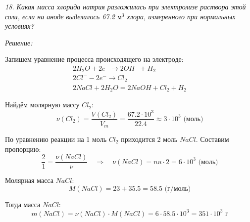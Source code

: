 \pagebreak

\emph{18. Какая масса хлорида натрия разложилась при электролизе раствора 
этой соли, если на аноде выделилось 67.2 \( \text{м}^3 \) хлора, 
измеренного при нормальных условиях?}

\emph{Решение:}

Запишем уравнение процесса происходящего на электроде:
\[
	\begin{array}{ll}
		2H_2O + 2e^{-} \rightarrow 2OH^{-} + H_2 \\
		2Cl^{-} - 2e^{-} \rightarrow Cl_2 \\
		2NaCl + 2H_2O = 2NaOH + Cl_2 + H_2
	\end{array}
\]

Найдём молярную массу \( Cl_2 \):
\[
	\nu(Cl_2) = \frac{V(Cl_2)}{V_m} = \frac{67.2\cdot10^3}{22.4} \approx 
	3\cdot10^3 \text{ (моль)}
\]

По уравнению реакции на 1 моль \( Cl_2 \) приходится 2 моль \( NaCl \). 
Составим пропорцию:
\[
	\frac{2}{1} = \frac{\nu(NaCl)}{\nu} \quad \Rightarrow \quad
	\nu(NaCl) = nu\cdot2 = 6\cdot10^3 \text{ (моль)}
\]

Молярная масса \( NaCl \):
\[
	M(NaCl) = 23 + 35.5 = 58.5 \text{ (г/моль)}
\]

Тогда масса \( NaCl \):
\[
	m(NaCl) = \nu(NaCl)\cdot M(NaCl) = 6 \cdot 58.5 \cdot 10^3 = 
	351 \cdot 10^3 \text{ г}
\]


